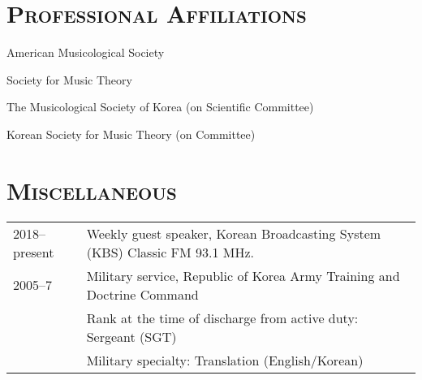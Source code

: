 \documentclass[a4paper,11pt]{article}
\begin{document}
  \vspace{2.5mm}
  
%  
%  
  \section*{\textsc{Professional Affiliations}}
  
  American Musicological Society
  
  \noindent Society for Music Theory
  
  \noindent The Musicological Society of Korea (on Scientific Committee)
  
  \noindent Korean Society for Music Theory (on Committee)
  
  
  \section*{\textsc{Miscellaneous}}
  
  \hspace*{-0.25cm}
  \begin{tabular}{p{2.5cm} l}
    2018–present & Weekly guest speaker, Korean Broadcasting System (KBS) Classic FM 93.1 MHz.\\
    
    2005–7 & Military service, Republic of Korea Army Training and Doctrine Command\\
    & Rank at the time of discharge from active duty: Sergeant (SGT)\\
    & Military specialty: Translation (English/Korean)
  \end{tabular}
\end{document}
